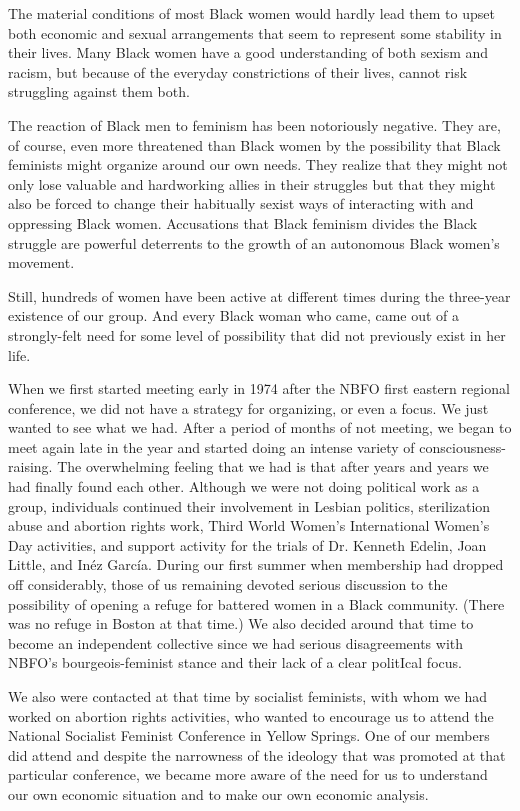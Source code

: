 \documentclass{article}
\begin{document}
The material conditions of most Black women would hardly lead them to upset
both economic and sexual arrangements that seem to represent some stability in
their lives. Many Black women have a good understanding of both sexism and
racism, but because of the everyday constrictions of their lives, cannot risk
struggling against them both.

The reaction of Black men to feminism has been notoriously negative. They are,
of course, even more threatened than Black women by the possibility that Black
feminists might organize around our own needs. They realize that they might not
only lose valuable and hardworking allies in their struggles but that they
might also be forced to change their habitually sexist ways of interacting with
and oppressing Black women. Accusations that Black feminism divides the Black
struggle are powerful deterrents to the growth of an autonomous Black women's
movement.

Still, hundreds of women have been active at different times during the
three-year existence of our group. And every Black woman who came, came out of
a strongly-felt need for some level of possibility that did not previously
exist in her life.

When we first started meeting early in 1974 after the NBFO first eastern
regional conference, we did not have a strategy for organizing, or even a
focus. We just wanted to see what we had. After a period of months of not
meeting, we began to meet again late in the year and started doing an intense
variety of consciousness-raising. The overwhelming feeling that we had is that
after years and years we had finally found each other. Although we were not
doing political work as a group, individuals continued their involvement in
Lesbian politics, sterilization abuse and abortion rights work, Third World
Women's International Women's Day activities, and support activity for the
trials of Dr. Kenneth Edelin, Joan Little, and Inéz García. During our first
summer when membership had dropped off considerably, those of us remaining
devoted serious discussion to the possibility of opening a refuge for battered
women in a Black community. (There was no refuge in Boston at that time.) We
also decided around that time to become an independent collective since we had
serious disagreements with NBFO's bourgeois-feminist stance and their lack of a
clear politIcal focus.

We also were contacted at that time by socialist feminists, with whom we had
worked on abortion rights activities, who wanted to encourage us to attend the
National Socialist Feminist Conference in Yellow Springs. One of our members
did attend and despite the narrowness of the ideology that was promoted at that
particular conference, we became more aware of the need for us to understand
our own economic situation and to make our own economic analysis.
\end{document}
